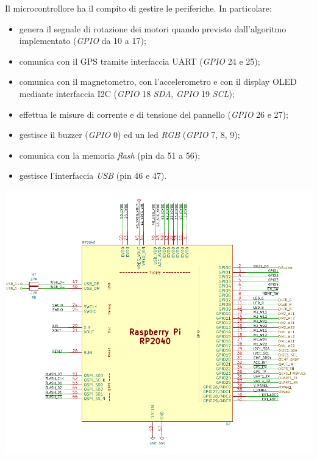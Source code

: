 \noindent Il microcontrollore ha il compito di gestire le periferiche. In
particolare:

\begin{itemize}
\item
  
  genera il segnale di rotazione dei motori quando previsto
  dall'algoritmo implementato (\emph{GPIO} da 10 a 17);
  
\item
  
  comunica con il GPS tramite interfaccia UART (\emph{GPIO} 24 e 25);
  
\item
  
  comunica con il magnetometro, con l'accelerometro e con il display
  OLED mediante interfaccia I2C (\emph{GPIO} 18 \emph{SDA}, \emph{GPIO}
  19 \emph{SCL});
  
\item
  
  effettua le misure di corrente e di tensione del pannello (\emph{GPIO}
  26 e 27);
  
\item
  
  gestisce il buzzer (\emph{GPIO} 0) ed un led \emph{RGB} (\emph{GPIO}
  7, 8, 9);
  
\item
  
  comunica con la memoria \emph{flash} (pin da 51 a 56);
  
\item
  
  gestisce l'interfaccia \emph{USB} (pin 46 e 47).
  
\end{itemize}

\begin{center}
\includegraphics[scale=0.45]{figures/image54.png}
\captionsetup{type=figure}
\end{center}


